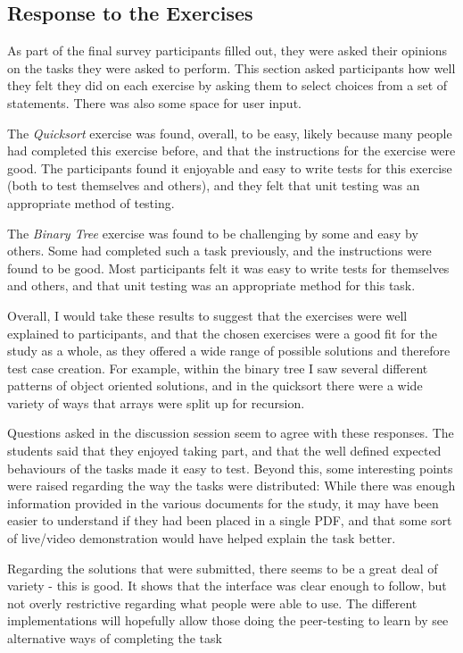 \documentclass[a4paper,11pt]{report}
\begin{document}
\subsection{Response to the Exercises}
As part of the final survey participants filled out, they were asked their opinions on the tasks they were asked to perform. This section asked participants how well they felt they did on each exercise by asking them to select choices from a set of statements. There was also some space for user input.\par
The \textit{Quicksort} exercise was found, overall, to be easy, likely because many people had completed this exercise before, and that the instructions for the exercise were good. The participants found it enjoyable and easy to write tests for this exercise (both to test themselves and others), and they felt that unit testing was an appropriate method of testing.\par
The \textit{Binary Tree} exercise was found to be challenging by some and easy by others. Some had completed such a task previously, and the instructions were found to be good. Most participants felt it was easy to write tests for themselves and others, and that unit testing was an appropriate method for this task.\par
Overall, I would take these results to suggest that the exercises were well explained to participants, and that the chosen exercises were a good fit for the study as a whole, as they offered a wide range of possible solutions and therefore test case creation. For example, within the binary tree I saw several different patterns of object oriented solutions, and in the quicksort there were a wide variety of ways that arrays were split up for recursion.\par
Questions asked in the discussion session seem to agree with these responses. The students said that they enjoyed taking part, and that the well defined expected behaviours of the tasks made it easy to test. Beyond this, some interesting points were raised regarding the way the tasks were distributed: While there was enough information provided in the various documents for the study, it may have been easier to understand if they had been placed in a single PDF, and that some sort of live/video demonstration would have helped explain the task better.\par
Regarding the solutions that were submitted, there seems to be a great deal of variety - this is good. It shows that the interface was clear enough to follow, but not overly restrictive regarding what people were able to use. The different implementations will hopefully allow those doing the peer-testing to learn by see alternative ways of completing the task\par
\end{document}
